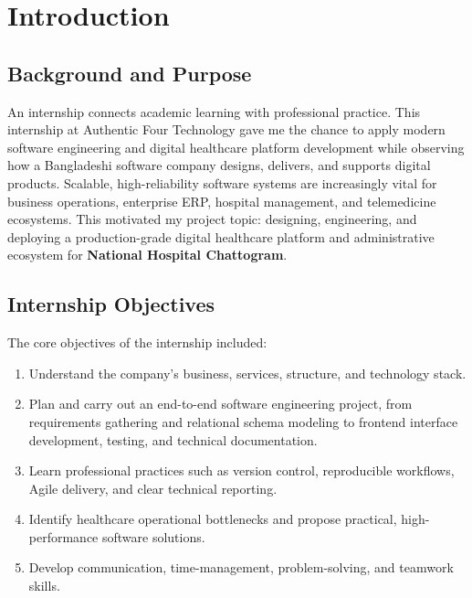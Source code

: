 \documentclass[11pt,a4paper,oneside]{report}
\begin{document}

\chapter{Introduction}

\section{Background and Purpose}
An internship connects academic learning with professional practice. This internship at Authentic Four Technology gave me the chance to apply modern software engineering and digital healthcare platform development while observing how a Bangladeshi software company designs, delivers, and supports digital products. Scalable, high-reliability software systems are increasingly vital for business operations, enterprise ERP, hospital management, and telemedicine ecosystems. This motivated my project topic: designing, engineering, and deploying a production-grade digital healthcare platform and administrative ecosystem for \textbf{National Hospital Chattogram}.

\section{Internship Objectives}
The core objectives of the internship included:
\begin{enumerate}
    \item Understand the company's business, services, structure, and technology stack.
    \item Plan and carry out an end-to-end software engineering project, from requirements gathering and relational schema modeling to frontend interface development, testing, and technical documentation.
    \item Learn professional practices such as version control, reproducible workflows, Agile delivery, and clear technical reporting.
    \item Identify healthcare operational bottlenecks and propose practical, high-performance software solutions.
    \item Develop communication, time-management, problem-solving, and teamwork skills.
\end{enumerate}
\end{document}
